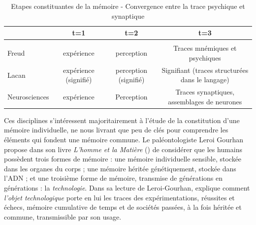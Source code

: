 {\small
\begin{table}[htbp]
    \centering
    \begin{tabulary}{\textwidth}{L|C C C}
        
        ~ & t=1  & t=2  & t=3 \\[2ex]
        
        \hline \\ [-1.5ex]
    
        Freud  & expérience  & perception  & Traces mnémiques et psychiques \\[3ex]

        Lacan & expérience (signifié)  &   perception (signifié)  &   Signifiant (traces structurées dans le langage) \\[3ex]

        Neurosciences &  expérience & Perception & Traces synaptiques, assemblages de neurones \\[3ex]

    \end{tabulary}

    \caption{ Etapes constituantes de la mémoire - Convergence entre la trace psychique et synaptique \citep{Ansermet2004} }
\end{table}}

Ces disciplines s{\textquoteright}intéressent majoritairement à l{\textquoteright}étude de la constitution d{\textquoteright}une mémoire individuelle, ne nous livrant que peu de clés pour comprendre les éléments qui fondent une mémoire commune. Le paléontologiste Leroi Gourhan propose dans son livre \textit{L{\textquoteright}homme et la Matière} (\citeyear{Leroi-Gourhan1971}) de considérer que les humains possèdent trois formes de mémoire : une mémoire individuelle sensible, stockée dans les organes du corps ; une mémoire héritée génétiquement, stockée dans l{\textquoteright}ADN ; et une troisième forme de mémoire, transmise de générations en générations : la \textit{technologie}. Dans sa lecture de Leroi-Gourhan, \cite{Stiegler1998} explique comment \textit{l{\textquoteright}objet technologique} porte en lui les traces des expérimentations, réussites et échecs, mémoire cumulative de temps et de sociétés passées, à la fois héritée et commune, transmissible par son usage.

